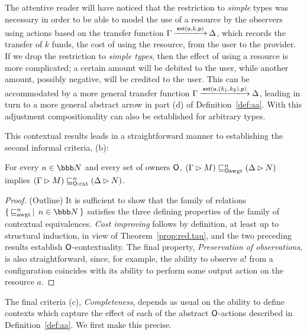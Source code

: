 \documentclass{LMCS}
\newcommand{\with}{\mathbin \rhd}
\newcommand{\ext}[3]{\mathsf{ext}({\ownfnt{#1}},{#2},{\ownfnt{#3}}) \xspace}
\newcommand{\nats}{\ensuremath{\bbb N}\xspace}
\newcommand{\ownO}{ {\ownfnt O}}
\newcommand{\Obscxtequiv}[2]{\mathrel{\sqsubseteq_{#1:\rm cxt}^{#2}}}
\newcommand{\Ocxtequiv}[1]{\Obscxtequiv{\ownO}{#1}}
\newcommand{\aamort}[1]{\mathrel{\sqsubseteq_{\rm awgt}^{#1}}}
\newcommand{\Obsaamort}[2]{\mathrel{\sqsubseteq_{\rm #1 awgt}^{#2}}}
\newcommand{\Oaamort}[1]{\Obsaamort{\ownO}{ #1}}
\newcommand{\setof}[2]{\{ \, #1 \, \mid \, #2 \, \}}\newcommand{\sset}[1]{\{ {#1}  \}  }
\newcommand{\ar}[1]{\mathbin{\xlongrightarrow{ #1}}}
\begin{document}
The attentive reader will have noticed that the restriction to \emph{simple} types
was necessary in order to be able to model the use of a resource by  the observers using actions
based on the transfer function 
$\Gamma  \ar{ \ext{u}{k}{p}} \Delta $, which records the transfer of
$k$ funds, the cost of using the resource, from the user to the provider. 
If we drop the restriction  to \emph{simple types},  then the effect of using a resource is more complicated;
a certain amount will be debited to the user, while another  amount, possibly negative,
will be credited to the user. This can be accommodated by a more general transfer function
$\Gamma  \ar{ \ext{u}{(k_1,k_2)}{p}} \Delta $, leading in turn to a more general abstract arrow in
part (d) of Definition~\ref{def:aa}. With this adjustment compositionality can also be established
for arbitrary types. 

This contextual results leads in a straightforward manner to establishing the second informal criteria, (b):
\begin{thm}[Soundness]
   For every $n \in \nats$ and every set of owners $\ownO$,  $(\Gamma \with M) \Oaamort{n} (\Delta \with N)$
  implies  $(\Gamma \with M) \Ocxtequiv{n} (\Delta \with N)$.
\end{thm}
\begin{proof}(Outline)
  It is sufficient to show that the family of relations $\setof{\aamort{n}}{ n\in \nats}$ satisfies the 
 three defining properties of the family of contextual equivalences. \emph{Cost improving} follows by
 definition, at least up to structural induction, in view of Theorem~\ref{prop:red.tau}, and  the two preceding
results establish $\ownO$-contextuality. The final property, \emph{Preservation of observations}, is also
straightforward, since, for example, the ability to observe $a!$ from a configuration coincides with its ability 
to perform some output action on the resource $a$.  
\end{proof}

The final criteria (c), \emph{Completeness}, depends as usual on the ability to define contexts which
capture the effect of  each of the abstract $\ownO$-actions described in Definition~\ref{def:aa}. 
We first make this precise. 

\newcommand{\Csucc}{\cfn{succ}}
\newcommand{\Cfail}{\cfn{fail}}
\end{document}
